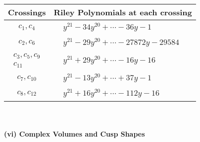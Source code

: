 \documentclass[1p]{elsarticle_modified}
\theoremstyle{definition}
\begin{document}
\begin{tabular}{m{50pt}|m{274pt}}
Crossings & \hspace{64pt}Riley Polynomials at each crossing \\
\hline $$\begin{aligned}c_{1},c_{4}\end{aligned}$$&$\begin{aligned}
&y^{21}-34 y^{20}+\cdots-36 y-1
\end{aligned}$\\
\hline $$\begin{aligned}c_{2},c_{6}\end{aligned}$$&$\begin{aligned}
&y^{21}-29 y^{20}+\cdots-27872 y-29584
\end{aligned}$\\
\hline $$\begin{aligned}c_{3},c_{5},c_{9}\\c_{11}\end{aligned}$$&$\begin{aligned}
&y^{21}+29 y^{20}+\cdots-16 y-16
\end{aligned}$\\
\hline $$\begin{aligned}c_{7},c_{10}\end{aligned}$$&$\begin{aligned}
&y^{21}-13 y^{20}+\cdots+37 y-1
\end{aligned}$\\
\hline $$\begin{aligned}c_{8},c_{12}\end{aligned}$$&$\begin{aligned}
&y^{21}+16 y^{20}+\cdots-112 y-16
\end{aligned}$\\
\hline
\end{tabular}\\~\\
\newpage\flushleft \textbf{(vi) Complex Volumes and Cusp Shapes}
\end{document}
